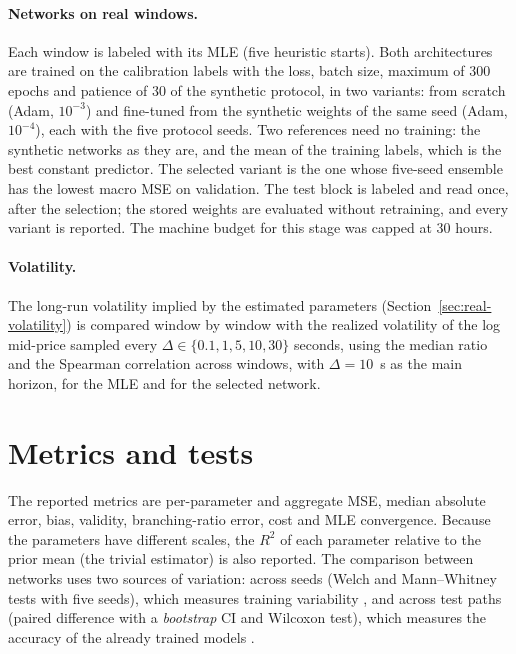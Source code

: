 \paragraph{Networks on real windows.} Each window is labeled with its MLE (five heuristic
starts). Both architectures are trained on the calibration labels with the loss, batch size,
maximum of 300 epochs and patience of 30 of the synthetic protocol, in two variants: from
scratch (Adam, \(10^{-3}\)) and fine-tuned from the synthetic weights of the same seed (Adam,
\(10^{-4}\)), each with the five protocol seeds. Two references need no training: the synthetic
networks as they are, and the mean of the training labels, which is the best constant
predictor. The selected variant is the one whose five-seed ensemble has the lowest macro MSE
on validation. The test block is labeled and read once, after the selection; the stored
weights are evaluated without retraining, and every variant is reported. The machine budget
for this stage was capped at 30 hours.

\paragraph{Volatility.} The long-run volatility implied by the estimated parameters
(Section~\ref{sec:real-volatility}) is compared window by window with the realized volatility
of the log mid-price sampled every \(\Delta\in\{0.1, 1, 5, 10, 30\}\) seconds, using the median
ratio and the Spearman correlation across windows, with \(\Delta=10\)~s as the main horizon,
for the MLE and for the selected network.

\section{Metrics and tests}

The reported metrics are per-parameter and aggregate MSE, median absolute error,
bias, validity, branching-ratio error, cost and MLE convergence. Because the
parameters have different scales, the \(R^2\) of each parameter relative to the prior
mean (the trivial estimator) is also reported. The comparison between networks uses
two sources of variation: across seeds (Welch and Mann--Whitney tests with five
seeds), which measures training variability \citep{bouthillier2021}, and across test
paths (paired difference with a \emph{bootstrap} CI and Wilcoxon test), which measures
the accuracy of the already trained models \citep{efron1993,diebold1995}.
